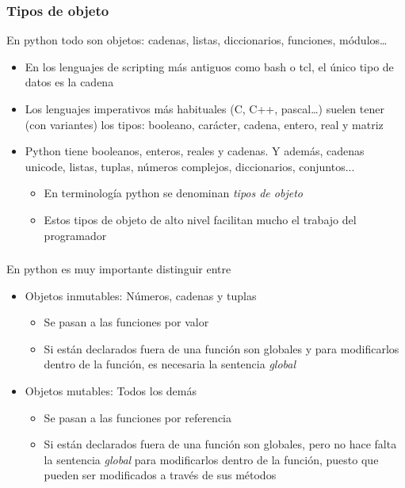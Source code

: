\documentclass[ucs]{beamer}
\begin{document}
\begin{frame}[fragile]
\frametitle{Tipos de objeto}

En python todo son objetos: cadenas, listas, diccionarios, funciones, módulos\ldots

\begin{itemize}
\item
En los lenguajes de scripting más antiguos como bash o tcl, el único 
tipo de datos es la cadena
\item
Los lenguajes imperativos más habituales (C, C++, pascal\ldots) suelen
tener (con variantes) los tipos: booleano, carácter, cadena, entero, real y matriz
\item
Python tiene booleanos, enteros, reales y cadenas. Y además, 
cadenas unicode, listas, tuplas, números complejos, diccionarios,
conjuntos...        

\begin{itemize}
\item
En terminología python se denominan \emph{tipos de objeto}
\item
Estos tipos de objeto de alto nivel facilitan mucho el trabajo del programador
\end{itemize}

\end{itemize}

\end{frame}


\begin{frame}[fragile]
\frametitle{}
En python es muy importante distinguir entre
\begin{itemize}
\item
Objetos inmutables: Números, cadenas y tuplas


\begin{itemize}
\item
Se pasan a las funciones por valor
\item
Si están declarados fuera de una función son
globales y para modificarlos dentro de la función,
es necesaria la sentencia \emph{global}
\end{itemize}


\item
Objetos mutables: Todos los demás

\begin{itemize}
\item
Se pasan a las funciones por referencia
\item
Si están declarados fuera de una función son
globales, pero no hace falta la 
sentencia \emph{global}
para modificarlos dentro de la función, puesto que pueden
ser modificados a través de sus métodos
\end{itemize}
\end{itemize}

\end{frame}
\end{document}

